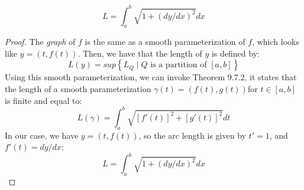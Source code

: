 \documentclass[hidelinks,12pt]{article}
\begin{document}
\begin{enumerate}
        \[L=\int_a^b\sqrt{1+(dy/dx)^2}dx\]
        \begin{proof}
            The \emph{graph} of $f$ is the same as a smooth parameterization of $f$, which looks like $y=(t,f(t))$. Then, we have that the length of $y$ is defined by:
            \[L(y)=sup\left\{L_Q\mid Q\text{ is a partition of }[a,b]\right\}\]
            Using this smooth parameterization, we can invoke Theorem 9.7.2, it states that the length of a smooth parameterization $\gamma(t)=(f(t),g(t))$for $t\in[a,b]$ is finite and equal to:
            \[L(\gamma)=\int_a^b\sqrt{[f'(t)]^2+[g'(t)]^2}dt\]
            In our case, we have $y=(t,f(t))$, so the arc length is given by $t'=1$, and $f'(t)=dy/dx$:
            \[L=\int_a^b\sqrt{1+(dy/dx)^2}dx\]
        \end{proof}

\end{enumerate}
\end{document}
